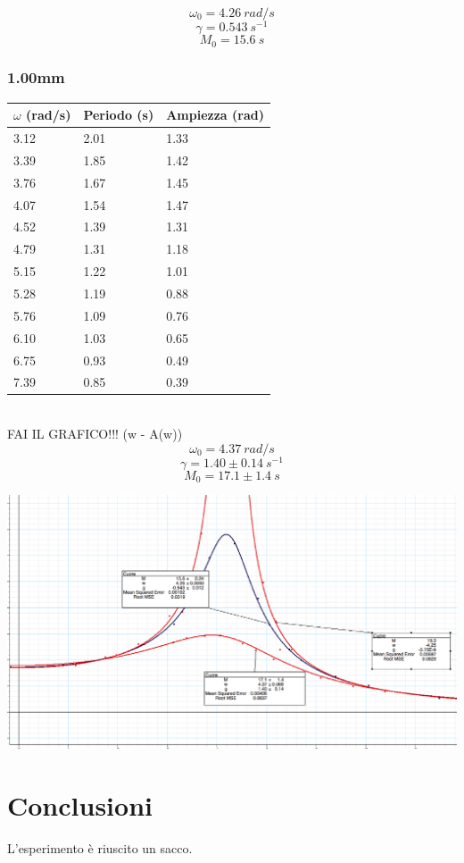 \documentclass[a4paper,10pt]{report}
\begin{document}
$$ \omega_0 = 4.26\ rad/s $$
$$ \gamma = 0.543\ s^{-1} $$
$$ M_0 = 15.6\ s$$


\subsubsection{1.00mm}
\begin{tabular}{l|l|l}
$\omega$ (rad/s) & Periodo (s) & Ampiezza (rad) \\
\midrule
3.12 & 2.01 & 1.33 \\
3.39 & 1.85 & 1.42 \\
3.76 & 1.67 & 1.45 \\
4.07 & 1.54 & 1.47 \\
4.52 & 1.39 & 1.31 \\
4.79 & 1.31 & 1.18 \\
5.15 & 1.22 & 1.01 \\
5.28 & 1.19 & 0.88 \\
5.76 & 1.09 & 0.76 \\
6.10 & 1.03 & 0.65 \\
6.75 & 0.93 & 0.49 \\
7.39 & 0.85 & 0.39 \\
\midrule
\end{tabular}
\\
FAI IL GRAFICO!!! (w - A(w))
\\

$$ \omega_0 = 4.37\ rad/s $$
$$ \gamma = 1.40 \pm 0.14\ s^{-1}$$
$$ M_0 = 17.1 \pm 1.4\ s$$

\includegraphics[scale=0.2]{graf}

\section{Conclusioni}
L'esperimento è riuscito un sacco.
\end{document}
